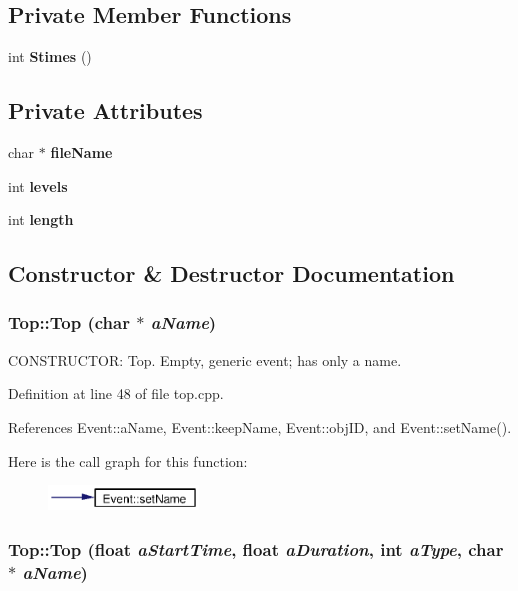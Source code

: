 \subsection*{Private Member Functions}
\begin{CompactItemize}
\item 
int {\bf Stimes} ()
\end{CompactItemize}
\subsection*{Private Attributes}
\begin{CompactItemize}
\item 
char $\ast$ {\bf file\-Name}
\item 
int {\bf levels}
\item 
int {\bf length}
\end{CompactItemize}


\subsection{Constructor \& Destructor Documentation}
\subsubsection{\setlength{\rightskip}{0pt plus 5cm}Top::Top (char $\ast$ {\em a\-Name})}\label{classTop_a0}


CONSTRUCTOR: Top. Empty, generic event; has only a name. 

Definition at line 48 of file top.cpp.

References Event::a\-Name, Event::keep\-Name, Event::obj\-ID, and Event::set\-Name().

Here is the call graph for this function:\begin{figure}[H]
\begin{center}
\leavevmode
\includegraphics[width=113pt]{classTop_a0_cgraph}
\end{center}
\end{figure}
\subsubsection{\setlength{\rightskip}{0pt plus 5cm}Top::Top (float {\em a\-Start\-Time}, float {\em a\-Duration}, int {\em a\-Type}, char $\ast$ {\em a\-Name})}\label{classTop_a1}



